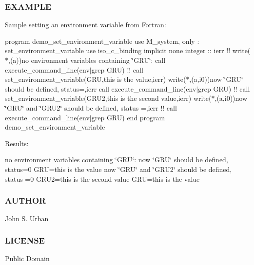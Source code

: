 \subsubsection*{E\+X\+A\+M\+P\+LE}

Sample setting an environment variable from Fortran\+:

program demo\+\_\+set\+\_\+environment\+\_\+variable use M\+\_\+system, only \+: set\+\_\+environment\+\_\+variable use iso\+\_\+c\+\_\+binding implicit none integer \+:\+: ierr !! write($\ast$,\textquotesingle{}(a)\textquotesingle{})\textquotesingle{}no environment variables containing \char`\"{}\+G\+R\+U\char`\"{}\+:\textquotesingle{} call execute\+\_\+command\+\_\+line(\textquotesingle{}env$\vert$grep G\+RU\textquotesingle{}) !! call set\+\_\+environment\+\_\+variable(\textquotesingle{}G\+RU\textquotesingle{},\textquotesingle{}this is the value\textquotesingle{},ierr) write($\ast$,\textquotesingle{}(a,i0)\textquotesingle{})\textquotesingle{}now \char`\"{}\+G\+R\+U\char`\"{} should be defined, status=\textquotesingle{},ierr call execute\+\_\+command\+\_\+line(\textquotesingle{}env$\vert$grep G\+RU\textquotesingle{}) !! call set\+\_\+environment\+\_\+variable(\textquotesingle{}G\+R\+U2\textquotesingle{},\textquotesingle{}this is the second value\textquotesingle{},ierr) write($\ast$,\textquotesingle{}(a,i0)\textquotesingle{})\textquotesingle{}now \char`\"{}\+G\+R\+U\char`\"{} and \char`\"{}\+G\+R\+U2\char`\"{} should be defined, status =\textquotesingle{},ierr !! call execute\+\_\+command\+\_\+line(\textquotesingle{}env$\vert$grep G\+RU\textquotesingle{}) end program demo\+\_\+set\+\_\+environment\+\_\+variable

Results\+:

no environment variables containing \char`\"{}\+G\+R\+U\char`\"{}\+: now \char`\"{}\+G\+R\+U\char`\"{} should be defined, status=0 G\+RU=this is the value now \char`\"{}\+G\+R\+U\char`\"{} and \char`\"{}\+G\+R\+U2\char`\"{} should be defined, status =0 G\+R\+U2=this is the second value G\+RU=this is the value \subsubsection*{A\+U\+T\+H\+OR}

John S. Urban \subsubsection*{L\+I\+C\+E\+N\+SE}

Public Domain 

